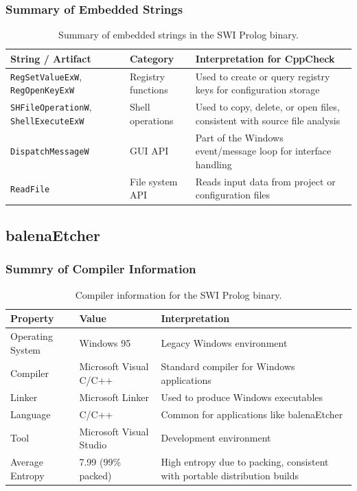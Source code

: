 \documentclass{article}
\begin{document}
\subsubsection{Summary of Embedded Strings}
\begin{table}[H]
  \centering
  \begin{tabular}{|p{5cm}|p{3cm}|p{7cm}|}
    \hline
    \textbf{String / Artifact} & \textbf{Category} & \textbf{Interpretation for CppCheck} \\
    \hline
    \texttt{RegSetValueExW}, \texttt{RegOpenKeyExW} & Registry functions & Used to create or query registry keys for configuration storage \\
    \hline
    \texttt{SHFileOperationW}, \texttt{ShellExecuteExW} & Shell operations & Used to copy, delete, or open files, consistent with source file analysis \\
    \hline
    \texttt{DispatchMessageW} & GUI API & Part of the Windows event/message loop for interface handling \\
    \hline
    \texttt{ReadFile} & File system API & Reads input data from project or configuration files \\
    \hline
  \end{tabular}
  \caption{Summary of embedded strings in the SWI Prolog binary.}
  \label{tab:cppcheck-strings}
\end{table}

\subsection{balenaEtcher}
\subsubsection{Summry of Compiler Information}
\begin{table}[H]
  \centering
  \begin{tabular}{|p{3cm}|p{3cm}|p{6cm}|}
    \hline
    \textbf{Property} & \textbf{Value} & \textbf{Interpretation} \\
    \hline
    Operating System & Windows 95 & Legacy Windows environment \\
    \hline
    Compiler & Microsoft Visual C/C++ & Standard compiler for Windows applications \\
    \hline
    Linker & Microsoft Linker & Used to produce Windows executables \\
    \hline
    Language & C/C++ & Common for applications like balenaEtcher \\
    \hline
    Tool & Microsoft Visual Studio & Development environment \\
    \hline
    Average Entropy & 7.99 (99\% packed) & High entropy due to packing, consistent with portable distribution builds \\
    \hline
  \end{tabular}
  \caption{Compiler information for the SWI Prolog binary.}
  \label{tab:prolog-compiler}
\end{table}
\end{document}
